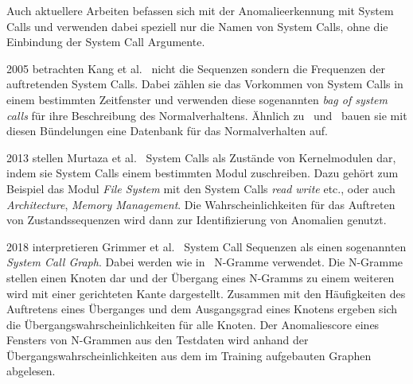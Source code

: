                 Auch aktuellere Arbeiten befassen sich mit der Anomalieerkennung mit System Calls und verwenden dabei speziell nur die Namen von System Calls, ohne die Einbindung der System Call Argumente.
            
                2005 betrachten Kang et al.~\cite{FREQUENCY2} nicht die Sequenzen sondern die Frequenzen der auftretenden System Calls.
                Dabei zählen sie das Vorkommen von System Calls in einem bestimmten Zeitfenster und verwenden diese sogenannten \textit{bag of system calls} für ihre Beschreibung des Normalverhaltens.
                Ähnlich zu~\cite{FORREST} und~\cite{STIDE} bauen sie mit diesen Bündelungen eine Datenbank für das Normalverhalten auf.

                2013 stellen Murtaza et al.~\cite{SYSTEM_STATES} System Calls als Zustände von Kernelmodulen dar, indem sie System Calls einem bestimmten Modul zuschreiben.
                Dazu gehört zum Beispiel das Modul \textit{File System} mit den System Calls \textit{read} \textit{write} etc., oder auch \textit{Architecture}, \textit{Memory Management}.
                Die Wahrscheinlichkeiten für das Auftreten von Zustandssequenzen wird dann zur Identifizierung von Anomalien genutzt.

                2018 interpretieren Grimmer et al.~\cite{SYSCALL_GRAPHS} System Call Sequenzen als einen sogenannten \textit{System Call Graph}.
                Dabei werden wie in~\cite{STIDE_Alternatives} N-Gramme verwendet.
                Die N-Gramme stellen einen Knoten dar und der Übergang eines N-Gramms zu einem weiteren wird mit einer gerichteten Kante dargestellt.
                Zusammen mit den Häufigkeiten des Auftretens eines Überganges und dem Ausgangsgrad eines Knotens ergeben sich die Übergangswahrscheinlichkeiten für alle Knoten.
                Der Anomaliescore eines Fensters von N-Grammen aus den Testdaten wird anhand der Übergangswahrscheinlichkeiten aus dem im Training aufgebauten Graphen abgelesen.


